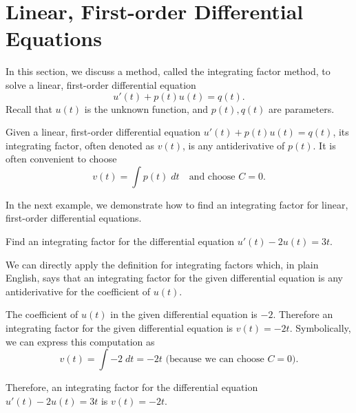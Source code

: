 \documentclass[../book.tex]{subfiles}
\begin{document}
\section{Linear, First-order Differential Equations}

In this section, we discuss a method, called the integrating factor method, to solve a linear, first-order differential equation
\begin{equation}\label{eq:de-10}
u'(t) + p(t) u(t) = q(t).
\end{equation}
Recall that \(u(t)\) is the unknown function, and \(p(t), q(t)\) are parameters.

\begin{definition} \label{def:de-1}
Given a linear, first-order differential equation \(u'(t) + p(t) u(t) = q(t)\), its integrating factor, often denoted as \(v(t)\), is any antiderivative of \(p(t)\).  It is often convenient to choose
\begin{equation}\label{eq:de-11}
v(t) = \int p(t) \;dt \quad\text{and choose } C = 0.
\end{equation}
\end{definition}

In the next example, we demonstrate how to find an integrating factor for linear, first-order differential equations.

\begin{example} \label{eg:find-integrating-factor}
Find an integrating factor for the differential equation \(u'(t) - 2 u(t) = 3t\).
\end{example}

\begin{solution}
We can directly apply the definition for integrating factors which, in plain English, says that an integrating factor for the given differential equation is any antiderivative for the coefficient of \(u(t)\).

The coefficient of \(u(t)\) in the given differential equation is \(-2\). Therefore an integrating factor for the given differential equation is \(v(t) = -2t\). Symbolically, we can express this computation as
\begin{equation}\label{eq:de-12}
v(t) = \int -2 \;dt = -2t \text{ (because we can choose \(C = 0\))}.
\end{equation}

Therefore, an integrating factor for the differential equation \(u'(t) - 2 u(t) = 3t\) is \(v(t) = -2t\).
\end{solution}
\end{document}
